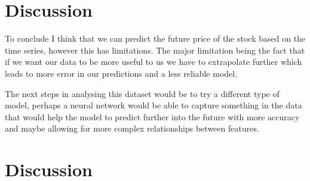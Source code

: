 \documentclass{report}
\begin{document}
\section{Discussion}

To conclude I think that we can predict the future price of the stock based on the time series, however this has limitations. The major limitation being the fact that if we want our data to be more useful to us we have to extrapolate further which leads to more error in our predictions and a less reliable model.

The next steps in analysing this dataset would be to try a different type of model, perhaps a neural network would be able to capture something in the data that would help the model to predict further into the future with more accuracy and maybe allowing for more complex relationships between features.


\section{Discussion}
\end{document}

